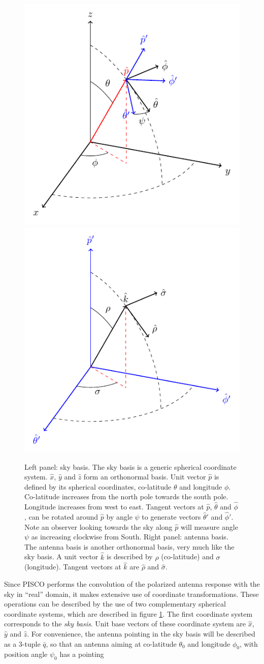\documentclass[a4paper,11pt]{article}
\begin{document}
\begin{figure}
	\centering
	\includegraphics[width=0.47\linewidth]{tikz/sky_basis}	
	\includegraphics[width=0.47\linewidth]{tikz/beam_basis}
	\caption{Left panel: sky basis. The sky basis is a generic spherical coordinate system. $\hat{x}$, $\hat{y}$ and $\hat{z}$ form an orthonormal basis. Unit vector $\hat{p}$ is defined by its spherical coordinates, co-latitude $\theta$ and longitude $\phi$. Co-latitude increases from the north pole towards the south pole. Longitude increases from west to east. Tangent vectors at $\hat{p}$, $\hat{\theta}$ and $\hat{\phi}$, can be rotated around $\hat{p}$ by angle $\psi$ to generate vectors $\hat{\theta}'$ and $\hat{\phi}'$. Note an observer looking towards the sky along $\hat{p}$ will measure angle $\psi$ as increasing clockwise from South. Right panel: antenna basis. The antenna basis is another orthonormal basis, very much like the sky basis. A unit vector $\hat{k}$ is described by $\rho$ (co-latitude) and $\sigma$ (longitude). Tangent vectors at $\hat{k}$ are $\hat{\rho}$ and $\hat{\sigma}$. }
	\label{fig::sky_basis} 
\end{figure}

Since PISCO performs the convolution of the polarized antenna response with the sky in ``real'' domain, it makes extensive use of coordinate transformations. These operations can be described by the use of two complementary spherical coordinate systems, which are described in figure \ref{fig::sky_basis}. The first coordinate system corresponds to the \textsl{sky basis}. Unit base vectors of these coordinate system are $\hat{x}$, $\hat{y}$ and $\hat{z}$. For convenience, the antenna pointing in the sky basis will be described as a 3-tuple $\bar{q}$, so that an antenna aiming at co-latitude $\theta_0$ and longitude $\phi_0$, with position angle $\psi_0$ has a pointing 
\end{document}
